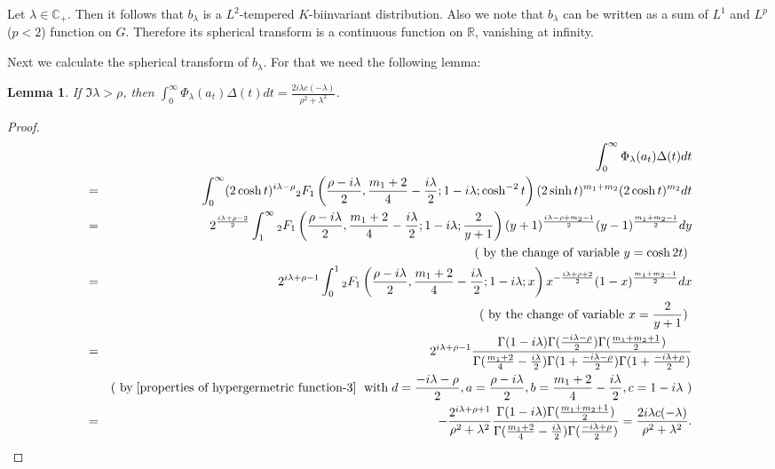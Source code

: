 \documentclass[11pt,reqno]{amsart}
\newcommand{\R}{\mathbb R}%
\newcommand{\C}{\mathbb C}%
\newtheorem{lemma}[theorem]{Lemma}
\theoremstyle{definition}
\theoremstyle{definition}
\numberwithin{equation}{section}
\begin{document}
Let $\lambda\in\C_+$. Then it follows that $b_\lambda$ is a $L^2$-tempered $K$-biinvariant distribution. Also we note that $b_\lambda$ can be written as a sum of $L^1$ and $L^p$ ($p<2$) function on $G$. Therefore its spherical transform is a continuous function on $\R$, vanishing at infinity.

Next we calculate the spherical transform of $b_\lambda$. For that we need the following lemma:

\begin{lemma}\label{integral 1}
If $\Im\lambda>\rho$, then $\int_0^\infty\Phi_\lambda(a_t)\Delta(t)dt=
\frac{2i\lambda c(-\lambda)}{\rho^2+\lambda^2}$.
\end{lemma}
\begin{proof}
\begin{eqnarray*}
&&\int_0^\infty \Phi_\lambda(a_t)\Delta(t)dt \\
&=&\int_0^\infty(2\cosh t)^{i\lambda-\rho}{}_2F_1\left(\frac{\rho-i\lambda}{2},\frac{m_1+2}{4}-\frac{i\lambda}{2};1-i\lambda;\cosh^{-2}t\right)(2\sinh t)^{m_1+m_2}(2\cosh t)^{m_2}dt\\
&=& 2^{\frac{i\lambda+\rho-2}{2}}\int_1^\infty{}_2F_1\left(\frac{\rho-i\lambda}{2},\frac{m_1+2}{4}-\frac{i\lambda}{2};1-i\lambda;\frac{2}{y+1}\right)(y+1)^{\frac{i\lambda-\rho+m_2-1}{2}}(y-1)^{\frac{m_1+m_2-1}{2}}dy\\
&&\textup{( by the change of variable $y=\cosh 2t$) }\\
&=& 2^{i\lambda+\rho-1}\int_0^1 {}_2F_1\left(\frac{\rho-i\lambda}{2},\frac{m_1+2}{4}-\frac{i\lambda}{2};1-i\lambda;x\right)x^{-\frac{i\lambda+\rho+2}{2}}(1-x)^{\frac{m_1+m_2-1}{2}}dx\\
&&\textup{( by the change of variable $x=\frac{2}{y+1}$) }\\
&=& 2^{i\lambda+\rho-1}\frac{\Gamma(1-i\lambda)\Gamma(\frac{-i\lambda-\rho} {2})\Gamma(\frac{m_1+m_2+1}{2})}{\Gamma(\frac{m_1+2}{4}-\frac{i\lambda}{2})\Gamma(1+\frac{-i\lambda-\rho}{2})\Gamma(1+\frac{-i\lambda+\rho}{2})}\\
&&\textup{( by}\hspace{1mm}\ref{properties of hypergermetric function-3}\hspace{1mm} \textup{ with}\hspace{1mm} d=\frac{-i\lambda-\rho}{2}, a=\frac{\rho-i\lambda}{2},b=\frac{m_1+2}{4}-\frac{i\lambda}{2},c=1-i\lambda\textup{ )}\\
&=& -\frac{2^{i\lambda+\rho+1}}{\rho^2+\lambda^2}\frac{\Gamma(1-i\lambda)\Gamma(\frac{m_1+m_2+1}{2})}{\Gamma(\frac{m_1+2}{4}-\frac{i\lambda}{2})\Gamma(\frac{-i\lambda+\rho}{2})}=\frac{2i\lambda c(-\lambda)}{\rho^2+\lambda^2}.
\end{eqnarray*}
\end{proof}
\end{document}
